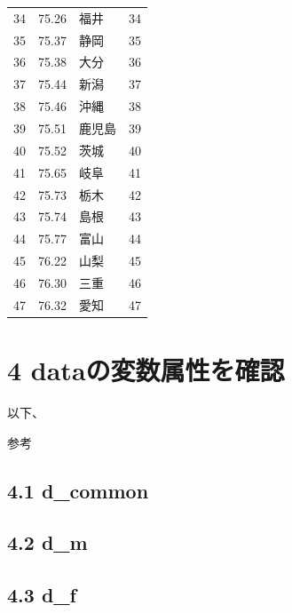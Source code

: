 \begin{table}[ht]
\begin{tabular}{rrlr}
  34 & 75.26 & 福井 &  34 \\ 
  35 & 75.37 & 静岡 &  35 \\ 
  36 & 75.38 & 大分 &  36 \\ 
  37 & 75.44 & 新潟 &  37 \\ 
  38 & 75.46 & 沖縄 &  38 \\ 
  39 & 75.51 & 鹿児島 &  39 \\ 
  40 & 75.52 & 茨城 &  40 \\ 
  41 & 75.65 & 岐阜 &  41 \\ 
  42 & 75.73 & 栃木 &  42 \\ 
  43 & 75.74 & 島根 &  43 \\ 
  44 & 75.77 & 富山 &  44 \\ 
  45 & 76.22 & 山梨 &  45 \\ 
  46 & 76.30 & 三重 &  46 \\ 
  47 & 76.32 & 愛知 &  47 \\ 
   \hline
\end{tabular}
\end{table}






\chapter{4 dataの変数属性を確認}





以下、



参考






\section{4.1 d\_common}

\section{4.2 d\_m}

\section{4.3 d\_f}



